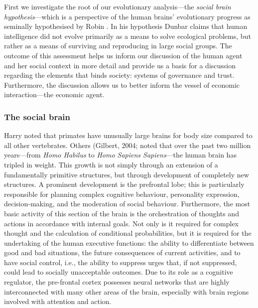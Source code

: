 First we investigate the root of our evolutionary analysis---the \emph{social brain hypothesis}---which is a perspective of the human brains' evolutionary progress as seminally hypothesised by Robin \citet{Dunbar1998}. In his hypothesis Dunbar claims that human intelligence did not evolve primarily as a means to solve ecological problems, but rather as a means of surviving and reproducing in large social groups. The outcome of this assessment helps us inform our discussion of the human agent and her social context in more detail and provide us a basis for a discussion regarding the elements that binds society: systems of governance and trust. Furthermore, the discussion allows us to better inform the vessel of economic interaction---the economic agent.

\subsubsection{The social brain}

Harry \citet{Jerison1973} noted that primates have unusually large brains for body size compared to all other vertebrates. Others (Gilbert, 2004; \citep{Schoenemann2006} noted that over the past two million years---from \emph{Homo Habilus} to \emph{Homo Sapiens Sapiens}---the human brain has tripled in weight. This growth is not simply through an extension of a fundamentally primitive structures, but through development of completely new structures. A prominent development is the prefrontal lobe; this is particularly responsible for planning complex cognitive behaviour, personality expression, decision-making, and the moderation of social behaviour. Furthermore, the most basic activity of this section of the brain is the orchestration of thoughts and actions in accordance with internal goals. Not only is it required for complex thought and the calculation of conditional probabilities, but it is required for the undertaking of the human executive functions: the ability to differentiate between good and bad situations, the future consequences of current activities, and to have social control, i.e., the ability to suppress urges that, if not suppressed, could lead to socially unacceptable outcomes. Due to its role as a cognitive regulator, the pre-frontal cortex possesses neural networks that are highly interconnected with many other areas of the brain, especially with brain regions involved with attention and action.

